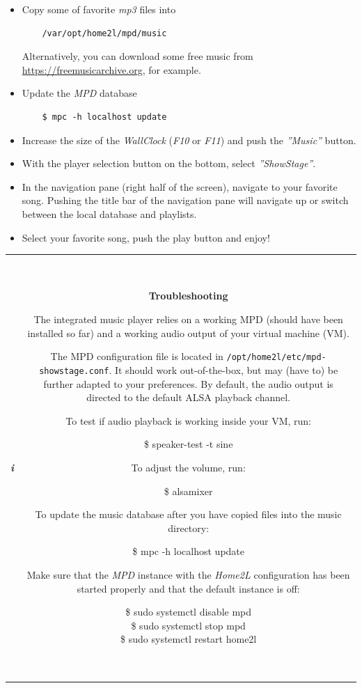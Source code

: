 \documentclass[12pt,english,parskip=half]{scrreprt}
\newcommand{\lstbox}[1]{
  \par
  \colorbox{lstbackground}{\ttfamily\footnotesize{\parbox{\linewidth}{#1}}}
  \par
}
\newcommand{\infobox}[1]{
  \hfill
  \setlength\arrayrulewidth{1pt}
  \begin{tabular}[t]{c|c|}
    \parbox{1.8em}{\hfill\textit{\Huge\textbf{i}\,}}
    &
    \,\parbox{0.89\linewidth}{\setlength{\parskip}{0.5em}#1}\,
  \end{tabular}
  \par
}
\begin{document}
\begin{itemize}[$\blacktriangleright$]
\item
  Copy some of favorite \emph{mp3} files into
  \begin{lstlisting}
    /var/opt/home2l/mpd/music
  \end{lstlisting}
  Alternatively, you can download some free music from \url{https://freemusicarchive.org},
  for example.

\item
  Update the \emph{MPD} database
  \begin{lstlisting}
    $ mpc -h localhost update
  \end{lstlisting}

\item
  Increase the size of the \emph{WallClock} (\emph{F10} or \emph{F11})
  and push the \emph{''Music''} button.

\item
  With the player selection button on the bottom, select
  \emph{''ShowStage''}.

\item
  In the navigation pane (right half of the screen), navigate to your
  favorite song. Pushing the title bar of the navigation pane will
  navigate up or switch between the local database and playlists.

\item
  Select your favorite song, push the play button and enjoy!

\end{itemize}


\infobox{
  \textbf{Troubleshooting}

  The integrated music player relies on a working MPD (should have been installed so far)
  and a working audio output of your virtual machine (VM).

  The MPD configuration file is located in \texttt{/opt/home2l/etc/mpd-showstage.conf}. It
  should work out-of-the-box, but may (have to) be further adapted to your preferences.
  By default, the audio output is directed to the default ALSA playback channel.

  To test if audio playback is working inside your VM, run:
  \lstbox{
    \$ speaker-test -t sine
  }

  To adjust the volume, run:
  \lstbox{
    \$ alsamixer
  }

  To update the music database after you have copied files into the music directory:
  \lstbox{
    \$ mpc -h localhost update
  }

  Make sure that the \emph{MPD} instance with the \emph{Home2L} configuration has been started properly
  and that the default instance is off:
  \lstbox{
    \$ sudo systemctl disable mpd \\
    \$ sudo systemctl stop mpd \\
    \$ sudo systemctl restart home2l
  }
}
\end{document}
